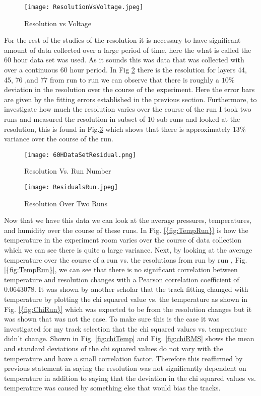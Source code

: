 \documentclass[./Thesis]{subfiles}
\begin{document}
\begin{figure}
	\centerline{\texttt{[image: ResolutionVsVoltage.jpeg]}}
	\caption[Resolution Vs Voltage]{ Resolution vs Voltage}
	\label{fig:ResVolt}
\end{figure} 	

	For the rest of the studies of the resolution it is necessary to have significant amount of data collected over a large period of time, here the what is called the 60 hour data set was used. As it sounds this was data that was collected with over a continuous 60 hour period. In Fig \ref{fig:ResNum} there is the resolution for layers 44, 45, 76 ,and 77 from run to run we can observe that there is roughly a $10\%$ deviation in the resolution over the course of the experiment. Here the error bars are given by the fitting errors established in the previous section. Furthermore, to investigate how much the resolution varies over the course of the run I took two runs and measured the resolution in subset of 10 sub-runs and looked at the resolution, this is found in Fig.\ref{fig:ResRun} which shows that there is approximately $13\%$ variance over the course of the run.
\begin{figure}
	\centerline{\texttt{[image: 60HDataSetResidual.png]}}
	\caption[60H Resolution]{ Resolution Vs. Run Number}
	\label{fig:ResNum}
\end{figure} 


\begin{figure}
	\centerline{\texttt{[image: ResidualsRun.jpeg]}}
	\caption[Resolution Over Two Runs]{ Resolution Over Two Runs}
	\label{fig:ResRun}
\end{figure} 


	
	 Now that we have this data we can look at the average pressures, temperatures, and humidity over the course of these runs. In Fig. \ref{{fig:TempRun}} is how the temperature in the experiment room varies over the course of data collection which we can see there is quite a large variance. Next, by looking at the average temperature over the course of a run vs. the resolutions from run by run , Fig. \ref{{fig:TempRun}}, we can see that there is no significant correlation between temperature and resolution changes with a Pearson correlation coefficient of 0.0643078. It was shown by another scholar that the track fitting changed with temperature by plotting the chi squared value vs. the temperature as shown in Fig. \ref{{fig:ChiRun}} which was expected to be from the resolution changes but it was shown that was not the case. To make sure this is the case it was investigated for my track selection that the chi squared values vs. temperature didn't change. Shown in Fig. \ref{fig:chiTemp} and Fig.  \ref{fig:chiRMS} shows the mean and standard deviations of the chi squared values do not vary with the temperature and have a small correlation factor. Therefore this reaffirmed by previous statement in saying the resolution was not significantly dependent on temperature in addition to saying that the deviation in the chi squared values vs. temperature was caused by something else that would bias the tracks.
	
\end{document}
